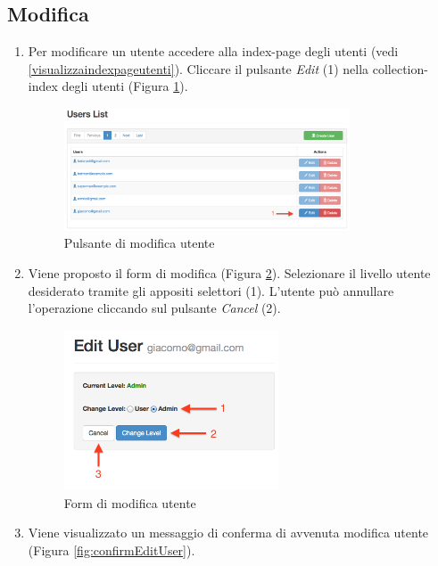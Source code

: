 	\subsection{Modifica} %
	\label{utenti-modifica}
		\begin{enumerate}

				\item Per modificare un utente accedere alla index-page degli utenti (vedi \ref{visualizzaindexpageutenti}). Cliccare il pulsante \emph{Edit} (1) nella collection-index degli utenti (Figura \ref{fig:editUserButton}).
					\begin{figure}[H]
						\centering \includegraphics[width=0.8\textwidth]{img/editUserButton.png}
						\caption{ \label{fig:editUserButton} Pulsante di modifica utente}
					\end{figure}

				\item Viene proposto il form di modifica (Figura \ref{fig:editUserLevel}). Selezionare il livello utente desiderato tramite gli appositi selettori (1). L'utente può annullare l'operazione cliccando sul pulsante \emph{Cancel} (2).

					\begin{figure}[H]
						\centering \includegraphics[width=0.6\textwidth]{img/editUserLevel.png}
						\caption{ \label{fig:editUserLevel} Form di modifica utente}
					\end{figure}

				\item Viene visualizzato un messaggio di conferma di avvenuta modifica utente (Figura \ref{fig:confirmEditUser}).


\end{enumerate}
